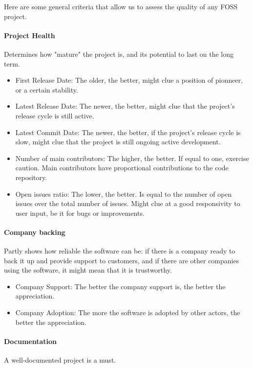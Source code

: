 \documentclass{article}
\begin{document}
Here are some general criteria that allow us to assess the quality of any FOSS project.

\paragraph{Project Health} Determines how "mature" the project is, and its potential to last on the long term.

\begin{itemize}
\item First Release Date: The older, the better, might clue a position of pionneer, or a certain stability.
\item Latest Release Date: The newer, the better, might clue that the project's release cycle is still active.
\item Latest Commit Date: The newer, the better, if the project's release cycle is slow, might clue that the project is still ongoing active development.
\item Number of main contributors: The higher, the better. If equal to one, exercise caution. Main contributors have proportional contributions to the code repository.
\item Open issues ratio: The lower, the better. Is equal to the number of open issues over the total number of issues. Might clue at a good responsivity to user input, be it for bugs or improvements.
\end{itemize}

\paragraph{Company backing} Partly shows how reliable the software can be: if there is a company ready to back it up and provide support to customers, and if there are other companies using the software, it might mean that it is trustworthy.

\begin{itemize}
\item Company Support: The better the company support is, the better the appreciation.
\item Company Adoption: The more the software is adopted by other actors, the better the appreciation.
\end{itemize}

\paragraph{Documentation} A well-documented project is a must.
\end{document}
